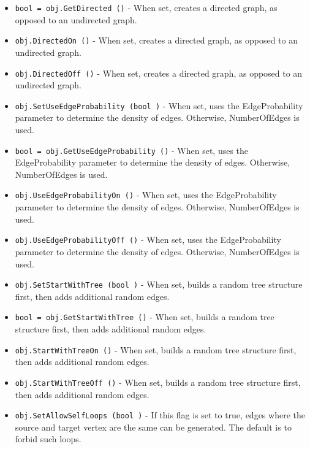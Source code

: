 \begin{itemize}
\item  \verb|bool = obj.GetDirected ()| -  When set, creates a directed graph, as opposed to an undirected graph.

\item  \verb|obj.DirectedOn ()| -  When set, creates a directed graph, as opposed to an undirected graph.

\item  \verb|obj.DirectedOff ()| -  When set, creates a directed graph, as opposed to an undirected graph.

\item  \verb|obj.SetUseEdgeProbability (bool )| -  When set, uses the EdgeProbability parameter to determine the density
 of edges.  Otherwise, NumberOfEdges is used.

\item  \verb|bool = obj.GetUseEdgeProbability ()| -  When set, uses the EdgeProbability parameter to determine the density
 of edges.  Otherwise, NumberOfEdges is used.

\item  \verb|obj.UseEdgeProbabilityOn ()| -  When set, uses the EdgeProbability parameter to determine the density
 of edges.  Otherwise, NumberOfEdges is used.

\item  \verb|obj.UseEdgeProbabilityOff ()| -  When set, uses the EdgeProbability parameter to determine the density
 of edges.  Otherwise, NumberOfEdges is used.

\item  \verb|obj.SetStartWithTree (bool )| -  When set, builds a random tree structure first, then adds additional
 random edges.

\item  \verb|bool = obj.GetStartWithTree ()| -  When set, builds a random tree structure first, then adds additional
 random edges.

\item  \verb|obj.StartWithTreeOn ()| -  When set, builds a random tree structure first, then adds additional
 random edges.

\item  \verb|obj.StartWithTreeOff ()| -  When set, builds a random tree structure first, then adds additional
 random edges.

\item  \verb|obj.SetAllowSelfLoops (bool )| -  If this flag is set to true, edges where the source and target
 vertex are the same can be generated.  The default is to forbid
 such loops.


\end{itemize}
